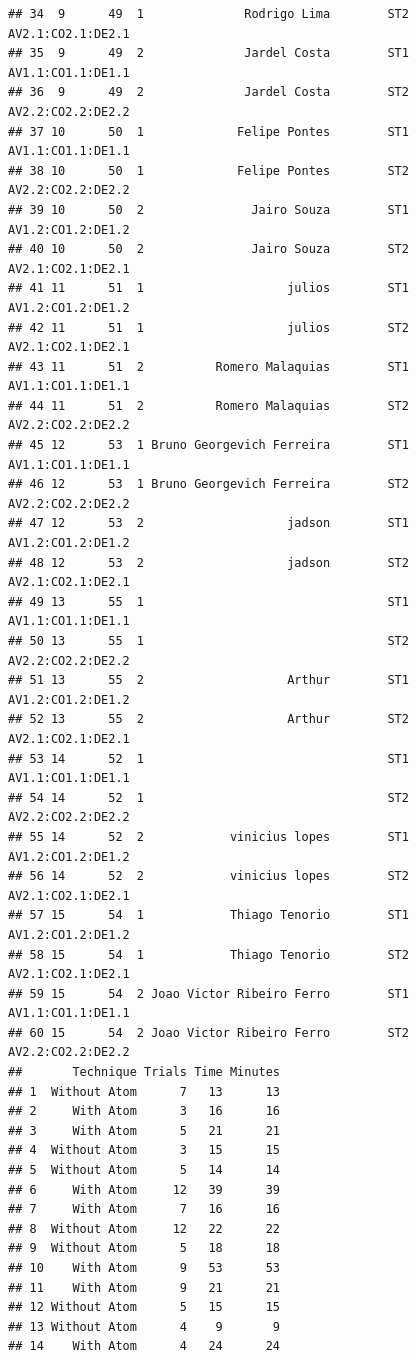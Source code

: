 \documentclass[]{article}
\begin{document}
\begin{verbatim}
## 34  9      49  1              Rodrigo Lima        ST2 AV2.1:CO2.1:DE2.1
## 35  9      49  2              Jardel Costa        ST1 AV1.1:CO1.1:DE1.1
## 36  9      49  2              Jardel Costa        ST2 AV2.2:CO2.2:DE2.2
## 37 10      50  1             Felipe Pontes        ST1 AV1.1:CO1.1:DE1.1
## 38 10      50  1             Felipe Pontes        ST2 AV2.2:CO2.2:DE2.2
## 39 10      50  2               Jairo Souza        ST1 AV1.2:CO1.2:DE1.2
## 40 10      50  2               Jairo Souza        ST2 AV2.1:CO2.1:DE2.1
## 41 11      51  1                    julios        ST1 AV1.2:CO1.2:DE1.2
## 42 11      51  1                    julios        ST2 AV2.1:CO2.1:DE2.1
## 43 11      51  2          Romero Malaquias        ST1 AV1.1:CO1.1:DE1.1
## 44 11      51  2          Romero Malaquias        ST2 AV2.2:CO2.2:DE2.2
## 45 12      53  1 Bruno Georgevich Ferreira        ST1 AV1.1:CO1.1:DE1.1
## 46 12      53  1 Bruno Georgevich Ferreira        ST2 AV2.2:CO2.2:DE2.2
## 47 12      53  2                    jadson        ST1 AV1.2:CO1.2:DE1.2
## 48 12      53  2                    jadson        ST2 AV2.1:CO2.1:DE2.1
## 49 13      55  1                                  ST1 AV1.1:CO1.1:DE1.1
## 50 13      55  1                                  ST2 AV2.2:CO2.2:DE2.2
## 51 13      55  2                    Arthur        ST1 AV1.2:CO1.2:DE1.2
## 52 13      55  2                    Arthur        ST2 AV2.1:CO2.1:DE2.1
## 53 14      52  1                                  ST1 AV1.1:CO1.1:DE1.1
## 54 14      52  1                                  ST2 AV2.2:CO2.2:DE2.2
## 55 14      52  2            vinicius lopes        ST1 AV1.2:CO1.2:DE1.2
## 56 14      52  2            vinicius lopes        ST2 AV2.1:CO2.1:DE2.1
## 57 15      54  1            Thiago Tenorio        ST1 AV1.2:CO1.2:DE1.2
## 58 15      54  1            Thiago Tenorio        ST2 AV2.1:CO2.1:DE2.1
## 59 15      54  2 Joao Victor Ribeiro Ferro        ST1 AV1.1:CO1.1:DE1.1
## 60 15      54  2 Joao Victor Ribeiro Ferro        ST2 AV2.2:CO2.2:DE2.2
##       Technique Trials Time Minutes
## 1  Without Atom      7   13      13
## 2     With Atom      3   16      16
## 3     With Atom      5   21      21
## 4  Without Atom      3   15      15
## 5  Without Atom      5   14      14
## 6     With Atom     12   39      39
## 7     With Atom      7   16      16
## 8  Without Atom     12   22      22
## 9  Without Atom      5   18      18
## 10    With Atom      9   53      53
## 11    With Atom      9   21      21
## 12 Without Atom      5   15      15
## 13 Without Atom      4    9       9
## 14    With Atom      4   24      24

\end{verbatim}
\end{document}
